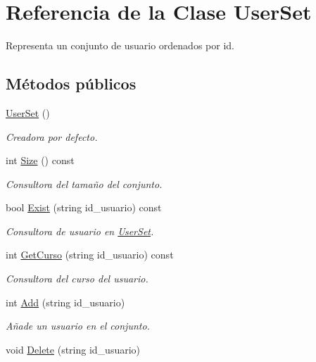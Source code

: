 \hypertarget{class_user_set}{}\section{Referencia de la Clase User\+Set}
\label{class_user_set}


Representa un conjunto de usuario ordenados por id.  


\subsection*{Métodos públicos}
\begin{DoxyCompactItemize}
\item 
\mbox{\hyperlink{class_user_set_a1fcb7215d45571e0f9c4cf4f20b05c80}{User\+Set}} ()
\begin{DoxyCompactList}\small\item\em Creadora por defecto. \end{DoxyCompactList}\item 
int \mbox{\hyperlink{class_user_set_a2474615357041661d6c00ce66209e747}{Size}} () const
\begin{DoxyCompactList}\small\item\em Consultora del tamaño del conjunto. \end{DoxyCompactList}\item 
bool \mbox{\hyperlink{class_user_set_a71ead20f591befdba9f6a1e524fa3271}{Exist}} (string id\+\_\+usuario) const
\begin{DoxyCompactList}\small\item\em Consultora de usuario en \mbox{\hyperlink{class_user_set}{User\+Set}}. \end{DoxyCompactList}\item 
int \mbox{\hyperlink{class_user_set_a20c73031d173fac4db788598ea20ce79}{Get\+Curso}} (string id\+\_\+usuario) const
\begin{DoxyCompactList}\small\item\em Consultora del curso del usuario. \end{DoxyCompactList}\item 
int \mbox{\hyperlink{class_user_set_af0b143d52582d95f08ad92c9eee64394}{Add}} (string id\+\_\+usuario)
\begin{DoxyCompactList}\small\item\em Añade un usuario en el conjunto. \end{DoxyCompactList}\item 
void \mbox{\hyperlink{class_user_set_a9a548c48abafd33e8460d9e8a9e40170}{Delete}} (string id\+\_\+usuario)

\end{DoxyCompactItemize}
